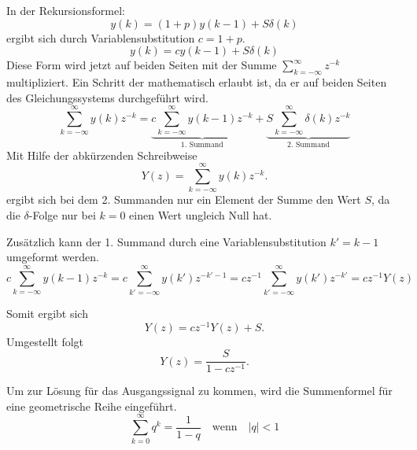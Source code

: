 In der Rekursionsformel:
\begin{equation}\label{eq:ZinsRekursionWiederholung}
    y(k) = (1+p) y(k-1) + S \delta(k)
\end{equation}
ergibt sich durch Variablensubstitution $c = 1+p$.
\begin{equation}\label{eq:ZinsRekursionMitc}
    y(k) = c y(k-1) + S \delta(k)
\end{equation}
Diese Form wird jetzt auf beiden Seiten mit der Summe $\sum_{k =
-\infty}^{\infty}z^{-k}$ multipliziert. Ein Schritt der
mathematisch erlaubt ist, da er auf beiden Seiten des
Gleichungssystems durchgeführt wird.
\begin{equation}
\sum_{k = -\infty}^{\infty} y(k) z^{-k} = \underbrace{c \sum_{k =
-\infty}^{\infty} y(k-1) z^{-k}}_{\mbox{1. Summand}} +
\underbrace{S \sum_{k = -\infty}^{\infty} \delta(k)
z^{-k}}_{\mbox{2. Summand}}
\end{equation}
Mit Hilfe der abkürzenden Schreibweise 
\begin{equation}\label{eq:Def:zTrafo}
Y(z) = \sum_{k = -\infty}^{\infty} y(k) z^{-k} .
\end{equation}
ergibt sich bei dem 2. Summanden nur ein Element der Summe den Wert
$S$, da die $\delta$-Folge nur bei $k = 0$ einen Wert ungleich
Null hat.

Zusätzlich kann der 1. Summand durch eine
Variablensubstitution $k' = k-1$ umgeformt werden.
\begin{equation}\label{eq:zTrafo:Example1Subst}
    c \sum_{k =
-\infty}^{\infty} y(k-1) z^{-k} = c \sum_{k' = -\infty}^{\infty}
y(k') z^{-k'-1} =c z^{-1}\sum_{k' = -\infty}^{\infty} y(k')
z^{-k'}=c z^{-1} Y(z)
\end{equation}

Somit ergibt sich
\begin{equation}\label{eq:zTrafo:Example1}
    Y(z) = c z^{-1} Y(z) + S .
\end{equation}
Umgestellt folgt
\begin{equation}\label{eq:ztrafo:Example1:zLoesung}
    Y(z) = \frac{S}{1-c z^{-1}} .
\end{equation}

Um zur Lösung für das Ausgangssignal zu kommen, wird die Summenformel für eine geometrische Reihe eingeführt.
\begin{equation}\label{eq:Def:geometrischeReihe}
    \sum_{k = 0}^{\infty} q^k = \frac{1}{1-q}  \quad \mbox{wenn} \quad
    |q|<1
\end{equation}

